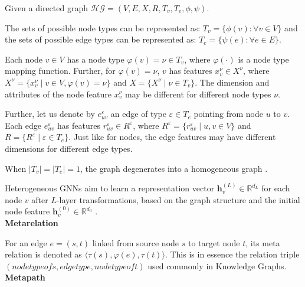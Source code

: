 \documentclass{report} %
\begin{document}
Given a directed graph \( \mathcal{HG} = (V, E, X, R, T_v, T_e, \phi, \psi) \).

The sets of possible node types can be represented as: \( T_v = \{ \phi(v) : \forall v \in V \} \) and the sets of possible edge types 
can be represented as: \( T_e = \{ \psi(e) : \forall e \in E \}.\) 

Each node \( v \in V \) has a node type \( \varphi(v) = \nu \in T_v \), where \( \varphi(\cdot) \) is a node type mapping function. 
Further, for \( \varphi(v) = \nu \), \( v \) has features \( x_v^{\nu} \in X^{\nu} \), 
where \( X^{\nu} = \{ x_v^{\nu} \mid v \in V, \varphi(v) = \nu \} \) and \( X = \{ X^{\nu} \mid \nu \in T_v \} \). 
The dimension and attributes of the node feature \( x_v^{\nu} \) may be different for different node types \( \nu \). 

Further, let us denote by \( e_{uv}^{\varepsilon} \) an edge of type \( \varepsilon \in T_e \) pointing from node \( u \) to \( v \). 
Each edge \( e_{uv}^{\varepsilon} \) has features \( r_{uv}^{\varepsilon} \in R^{\varepsilon} \), 
where \( R^{\varepsilon} = \{ r_{uv}^{\varepsilon} \mid u, v \in V \} \) and \( R = \{ R^{\varepsilon} \mid \varepsilon \in T_e \} \). 
Just like for nodes, the edge features may have different dimensions for different edge types.

When \( |T_v| = |T_e| = 1 \), the graph degenerates into a homogeneous graph \cite{SE HGNN-2023}.

Heterogeneous \ac{GNN}s aim to learn a representation vector \( \mathbf{h}^{(L)}_v \in \mathbb{R}^{d_L} \) for each node \( v \) after \( L \)-layer transformations, 
based on the graph structure and the initial node feature \( \mathbf{h}^{(0)}_v \in \mathbb{R}^{d_0} \) \cite{REF HGNN-2021}.\\

\textbf{Metarelation}

For an edge \( e = (s, t) \) linked from source node \( s \) to target node \( t \), its meta relation is denoted as
$\langle \tau(s), \varphi(e), \tau(t) \rangle.$
This is in essence the relation triple  \(  (node type of s, edge type, node type of t) \) used commonly in Knowledge Graphs.\\

\textbf{Metapath}
\end{document}
